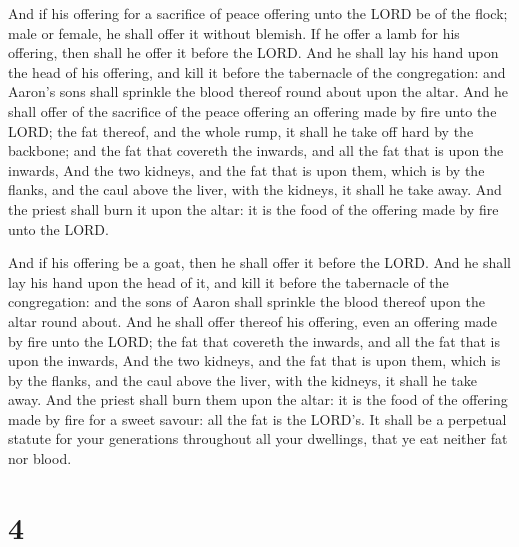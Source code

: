  And if his offering for a sacrifice of peace offering
unto the LORD be of the flock; male or female, he shall offer it without
blemish.  If he offer a lamb for his offering, then shall
he offer it before the LORD.  And he shall lay his hand
upon the head of his offering, and kill it before the tabernacle of the
congregation: and Aaron's sons shall sprinkle the blood thereof round
about upon the altar.  And he shall offer of the sacrifice
of the peace offering an offering made by fire unto the LORD; the fat
thereof, and the whole rump, it shall he take off hard by the backbone;
and the fat that covereth the inwards, and all the fat that is upon the
inwards,  And the two kidneys, and the fat that is upon
them, which is by the flanks, and the caul above the liver, with the
kidneys, it shall he take away.  And the priest shall
burn it upon the altar: it is the food of the offering made by fire unto
the LORD.

 And if his offering be a goat, then he shall offer it
before the LORD.  And he shall lay his hand upon the head
of it, and kill it before the tabernacle of the congregation: and the
sons of Aaron shall sprinkle the blood thereof upon the altar round
about.  And he shall offer thereof his offering, even an
offering made by fire unto the LORD; the fat that covereth the inwards,
and all the fat that is upon the inwards,  And the two
kidneys, and the fat that is upon them, which is by the flanks, and the
caul above the liver, with the kidneys, it shall he take away.
 And the priest shall burn them upon the altar: it is the
food of the offering made by fire for a sweet savour: all the fat is the
LORD's.  It shall be a perpetual statute for your
generations throughout all your dwellings, that ye eat neither fat nor
blood.

\hypertarget{section-3}{%
\section{4}\label{section-3}}

